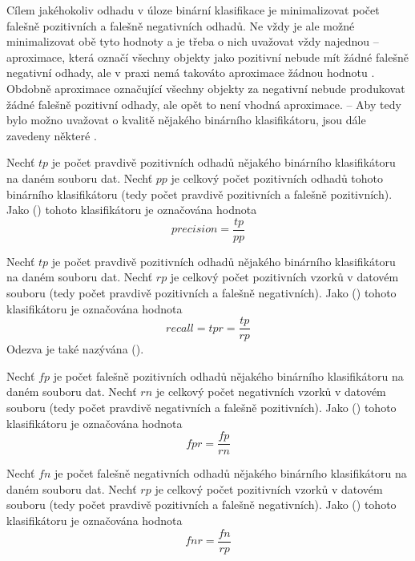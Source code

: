Cílem jakéhokoliv odhadu v úloze binární klasifikace je minimalizovat počet falešně pozitivních a falešně negativních odhadů. Ne vždy je ale možné minimalizovat obě tyto hodnoty a je třeba o nich uvažovat vždy najednou -- aproximace, která označí všechny objekty jako pozitivní nebude mít žádné falešně negativní odhady, ale v praxi nemá takováto aproximace žádnou hodnotu . Obdobně aproximace označující všechny objekty za negativní nebude produkovat žádné falešně pozitivní odhady, ale opět to není vhodná aproximace. -- Aby tedy bylo možno uvažovat o kvalitě nějakého binárního klasifikátoru, jsou dále zavedeny některé  .


\begin{define}
	Nechť \( tp \) je počet pravdivě pozitivních odhadů nějakého binárního klasifikátoru na daném souboru dat. Nechť \( pp \) je celkový počet pozitivních odhadů tohoto binárního klasifikátoru (tedy počet pravdivě pozitivních a falešně pozitivních). Jako  () tohoto klasifikátoru je označována hodnota
	\[ precision = \frac{tp}{pp} \]
\end{define}

\begin{define}
	Nechť \( tp \) je počet pravdivě pozitivních odhadů nějakého binárního klasifikátoru na daném souboru dat. Nechť \( rp \) je celkový počet pozitivních vzorků v datovém souboru (tedy počet pravdivě pozitivních a falešně negativních). Jako  () tohoto klasifikátoru je označována hodnota
	\[ recall = tpr = \frac{tp}{rp} \]
	Odezva je také nazývána  ().
\end{define}

\begin{define}
	Nechť \( fp \) je počet falešně pozitivních odhadů nějakého binárního klasifikátoru na daném souboru dat. Nechť \( rn \) je celkový počet negativních vzorků v datovém souboru (tedy počet pravdivě negativních a falešně pozitivních). Jako  () tohoto klasifikátoru je označována hodnota
	\[ fpr = \frac{fp}{rn} \]
\end{define}

\begin{define}
	Nechť \( fn \) je počet falešně negativních odhadů nějakého binárního klasifikátoru na daném souboru dat. Nechť \( rp \) je celkový počet pozitivních vzorků v datovém souboru (tedy počet pravdivě pozitivních a falešně negativních). Jako  () tohoto klasifikátoru je označována hodnota
	\[ fnr = \frac{fn}{rp} \]
\end{define}

